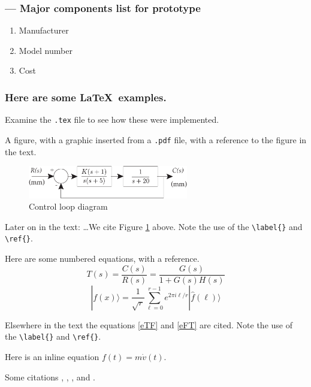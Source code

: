 \documentclass[twocolumn]{article}
\newcommand{\ket}[1]{|#1\rangle}
\begin{document}
\subsubsection*{ --- Major components list for prototype}
\begin{enumerate}
\item{Manufacturer}
\item{Model number}
\item{Cost}
\end{enumerate}

\newpage
\subsubsection*{Here are some \LaTeX\ examples.} 

Examine the \verb|.tex| file to see how these were implemented.

\vspace{.167in}
A figure, with a graphic inserted from a \verb|.pdf| file, with a reference to the figure in the text.
\begin{figure}[htbp]
\begin{center}
\includegraphics[width=2.75in]{ControlLoop2.pdf}
\caption{Control loop diagram}
\label{ControlLoop}
\end{center}
\end{figure}

Later on in the text: \dots We cite Figure \ref{ControlLoop} above.  Note the use of the \verb|\label{}| and \verb|\ref{}|.

Here are some numbered equations, with a reference.
\begin{equation}
T(s)=\frac{C(s)}{R(s)}=\frac{G(s)}{1+G(s)H(s)}
\label{eTF}
\end{equation}
\begin{equation}
\ket{f(x)} = \frac{1}{\sqrt{r}}\sum_{\ell=0}^{r-1}e^{2\pi i \ell/r}\ket{\hat{f}(\ell)}
\label{eFT}
\end{equation}

Elsewhere in  the text the equations \ref{eTF} and \ref{eFT} are cited. Note the use of the \verb|\label{}| and \verb|\ref{}|.

\vspace{.167in}
Here is an inline equation $f(t)=m\dot{v}(t)$. 
 
\vspace{.167in}
Some citations \cite{Bendat1971}, \cite{PhysRev.104.563}, \cite{Oppenheim1975}, and \cite{Papoulis1965}. 
 
\end{document}
